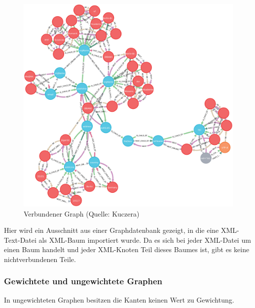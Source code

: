 \begin{figure}
\centering
\includegraphics{Bilder/connectedGraph.png}
\caption{Verbundener Graph (Quelle: Kuczera)}
\end{figure}

Hier wird ein Ausschnitt aus einer Graphdatenbank gezeigt, in die eine
XML-Text-Datei als XML-Baum importiert wurde. Da es sich bei jeder
XML-Datei um einen Baum handelt und jeder XML-Knoten Teil dieses Baumes
ist, gibt es keine nichtverbundenen Teile.

\hypertarget{gewichtete-und-ungewichtete-graphen}{%
\subsubsection{Gewichtete und ungewichtete
Graphen}\label{gewichtete-und-ungewichtete-graphen}}

In ungewichteten Graphen besitzen die Kanten keinen Wert zu Gewichtung.

